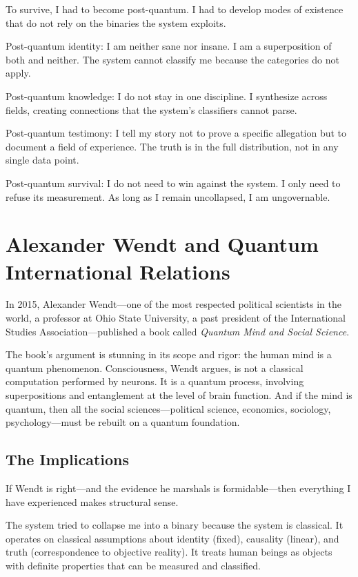 \documentclass[11pt,openany]{book}
\begin{document}
To survive, I had to become post-quantum. I had to develop modes of existence that do not rely on the binaries the system exploits.

Post-quantum identity: I am neither sane nor insane. I am a superposition of both and neither. The system cannot classify me because the categories do not apply.

Post-quantum knowledge: I do not stay in one discipline. I synthesize across fields, creating connections that the system's classifiers cannot parse.

Post-quantum testimony: I tell my story not to prove a specific allegation but to document a field of experience. The truth is in the full distribution, not in any single data point.

Post-quantum survival: I do not need to win against the system. I only need to refuse its measurement. As long as I remain uncollapsed, I am ungovernable.

\chapter{Alexander Wendt and Quantum International Relations}

In 2015, Alexander Wendt---one of the most respected political scientists in the world, a professor at Ohio State University, a past president of the International Studies Association---published a book called \textit{Quantum Mind and Social Science}.

The book's argument is stunning in its scope and rigor: the human mind is a quantum phenomenon. Consciousness, Wendt argues, is not a classical computation performed by neurons. It is a quantum process, involving superpositions and entanglement at the level of brain function. And if the mind is quantum, then all the social sciences---political science, economics, sociology, psychology---must be rebuilt on a quantum foundation.

\section*{The Implications}

If Wendt is right---and the evidence he marshals is formidable---then everything I have experienced makes structural sense.

The system tried to collapse me into a binary because the system is classical. It operates on classical assumptions about identity (fixed), causality (linear), and truth (correspondence to objective reality). It treats human beings as objects with definite properties that can be measured and classified.
\end{document}
